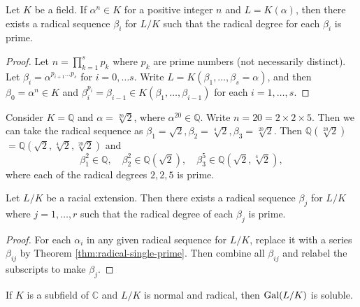 \begin{theorem} \label{thm:radical-single-prime}
    Let $K$ be a field. If $\alpha ^ n \in K$ for a positive integer $n$ and  $L = K (\alpha)$, then there exists a radical sequence $\beta_i$ for $L / K$ such that the radical degree for each $\beta_i$ is prime.
\end{theorem}

\begin{proof}
    Let $n = \prod_{k=1}^{s} p_{k}$ where $p_{k}$ are prime numbers (not necessarily distinct). Let $\beta_{i} = \alpha^ {p_{i + 1} \dots  p_{s}}$ for $i = 0, \dots s$. Write $L = K(\beta_1,  \dots, \beta_s = \alpha)$, and then $\beta_0 = \alpha^n \in K$ and  $\beta_i ^ {p_i} = \beta_{i-1} \in K(\beta_1, \dots, \beta_{i - 1})$ for each $i  = 1, \dots, s$. 
\end{proof}

\begin{example}
    Consider $K  = \mathbb Q$ and $\alpha = \sqrt[20]{2}$, where $\alpha ^ {20} \in \mathbb Q$. Write $n = 20 =  2 \times 2 \times 5 $. Then we can take the radical sequence as $\beta_1 = \sqrt 2, \beta_2 = \sqrt[4]{2}, \beta_3 = \sqrt[20]{2}$. Then $\mathbb Q(\sqrt[20]{2}) $ $= \mathbb Q(\sqrt{2}, \sqrt[4]{2}, \sqrt[20]{2})$ and 
    $$
    \beta_1 ^ 2 \in \mathbb Q, \quad \beta_2 ^ 2 \in \mathbb Q(\sqrt{2}), \quad \beta_3^5 \in \mathbb Q (\sqrt{2}, \sqrt[4]{2}),
    $$
    where each of the radical degrees $2, 2, 5$ is prime.
\end{example}

\begin{theorem} \label{thm:radical-all-prime}
    Let $L / K$ be a racial extension. Then there exists a radical sequence $\beta_j$ for $L / K$ where $j=1, \dots, r$ such that the radical degree of each $\beta_j$ is prime.
\end{theorem}

\begin{proof}
    For each $\alpha_i$ in any given radical sequence for $L / K$, replace it with a series $\beta_{ij}$ by Theorem \ref{thm:radical-single-prime}. Then combine all $\beta_{ij}$ and relabel the subscripts to make $\beta_{j}$. 
\end{proof}

\begin{theorem} \label{thm:radical-3}
If $K$ is a subfield of $\mathbb{C}$ and $L / K$ is normal and radical, then $\operatorname{Gal}(L / K)$ is soluble.
\end{theorem}

